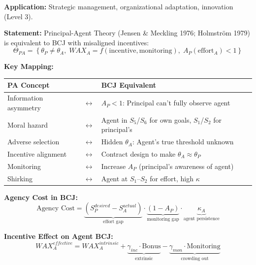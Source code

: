 \begin{tcolorbox}[colback=green!5!white, colframe=green!75!black,
    title=Theorem BCJ-T31: Behavioral Theory of the Firm as Special Case]
\textbf{Application:} Strategic management, organizational adaptation, innovation (Level 3).
\end{tcolorbox}

\begin{tcolorbox}[colback=green!5!white, colframe=green!75!black,
    title=Theorem BCJ-T32: Principal-Agent Theory as Special Case]
\textbf{Statement:} Principal-Agent Theory (Jensen \& Meckling 1976; Holmström 1979) is equivalent to BCJ with misaligned incentives:
\begin{equation}
\Theta_{PA} = \left\{\theta_P \neq \theta_A, \; WAX_A = f(\text{incentive}, \text{monitoring}), \; A_P(\text{effort}_A) < 1\right\}
\end{equation}

\textbf{Key Mapping:}
\begin{center}
\begin{tabular}{lcl}
\toprule
\textbf{PA Concept} & & \textbf{BCJ Equivalent} \\
\midrule
Information asymmetry & $\leftrightarrow$ & $A_P < 1$: Principal can't fully observe agent \\
Moral hazard & $\leftrightarrow$ & Agent in $S_5$/$S_6$ for own goals, $S_1$/$S_2$ for principal's \\
Adverse selection & $\leftrightarrow$ & Hidden $\theta_A$: Agent's true threshold unknown \\
Incentive alignment & $\leftrightarrow$ & Contract design to make $\theta_A \approx \theta_P$ \\
Monitoring & $\leftrightarrow$ & Increase $A_P$ (principal's awareness of agent) \\
Shirking & $\leftrightarrow$ & Agent at $S_1$--$S_2$ for effort, high $\kappa$ \\
\bottomrule
\end{tabular}
\end{center}

\textbf{Agency Cost in BCJ:}
\begin{equation}
\text{Agency Cost} = \underbrace{(S_P^{desired} - S_A^{actual})}_{\text{effort gap}} \cdot \underbrace{(1 - A_P)}_{\text{monitoring gap}} \cdot \underbrace{\kappa_A}_{\text{agent persistence}}
\end{equation}

\textbf{Incentive Effect on Agent BCJ:}
\begin{equation}
WAX_A^{effective} = WAX_A^{intrinsic} + \underbrace{\gamma_{inc} \cdot \text{Bonus}}_{\text{extrinsic}} - \underbrace{\gamma_{mon} \cdot \text{Monitoring}}_{\text{crowding out}}
\end{equation}


\end{tcolorbox}
